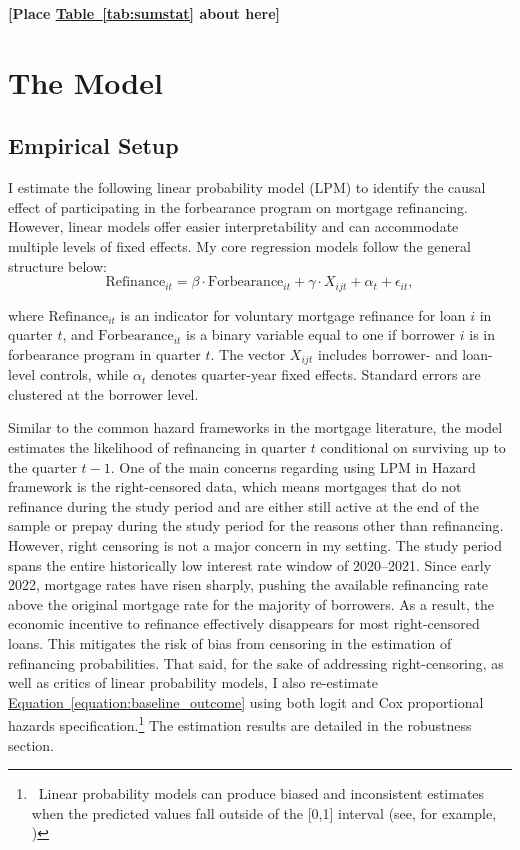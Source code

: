 \documentclass[11pt]{article}
\begin{document}
\bigskip
\centerline{\bf [Place \hyperref[tab:sumstat]{Table~\ref*{tab:sumstat}} about here]}
\bigskip



\section{The Model} \label{sec:model}



\subsection{Empirical Setup}

I estimate the following linear probability model (LPM) to identify the causal effect of participating in the forbearance program on mortgage refinancing. However, linear models offer easier interpretability and can accommodate multiple levels of fixed effects. My core regression models follow the general structure below:
\begin{equation}
\label{equation:baseline_outcome}
\text{Refinance}_{it} = 
\beta \cdot \text{Forbearance}_{it} +  
\gamma \cdot X_{ijt} + 
\alpha_{t} + 
\epsilon_{it},
\end{equation}

\noindent
where $\text{Refinance}_{it}$ is an indicator for voluntary mortgage refinance for loan $i$ in quarter $t$, and $\text{Forbearance}_{it}$ is a binary variable equal to one if borrower $i$ is in forbearance program in quarter $t$. The vector $X_{ijt}$ includes borrower- and loan-level controls, while $\alpha_t$ denotes quarter-year fixed effects. Standard errors are clustered at the borrower level.

Similar to the common hazard frameworks in the mortgage literature, the model estimates the likelihood of refinancing in quarter $t$ conditional on surviving up to the quarter $t-1$. One of the main concerns regarding using LPM in Hazard framework is the right-censored data, which means mortgages that do not refinance during the study period and are either still active at the end of the sample or prepay during the study period for the reasons other than refinancing. However, right censoring is not a major concern in my setting. The study period spans the entire historically low interest rate window of 2020–2021. Since early 2022, mortgage rates have risen sharply, pushing the available refinancing rate above the original mortgage rate for the majority of borrowers. As a result, the economic incentive to refinance effectively disappears for most right-censored loans. This mitigates the risk of bias from censoring in the estimation of refinancing probabilities. That said, for the sake of addressing right-censoring, as well as critics of linear probability models, I also re-estimate \hyperref[equation:baseline_outcome]{Equation~\ref{equation:baseline_outcome}} using both logit and Cox proportional hazards specification.\footnote{~Linear probability models can produce biased and inconsistent estimates when the predicted values fall outside of the [0,1] interval (see, for example, \citet{horrace2006results})} The estimation results are detailed in the robustness section.
\end{document}
